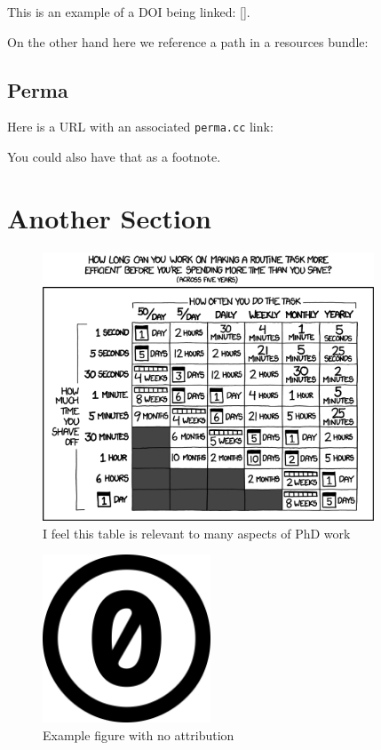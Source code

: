 This is an example of a DOI being linked: [].

On the other hand here we reference a path in a resources bundle:\\

\subsection{Perma}
\label{sec:example..links.doi}


Here is a URL with an associated \texttt{perma.cc} link:\\

You could also have that as a footnote.


\section{Another Section}
\label{sec:example.another}

\lipsum[3]

\begin{figure}[h!]
	\centering
	\captionsetup{justification=centering}
	\includegraphics[height=8cm]{images/examples/xkcd_1205_is_it_worth_the_time_2x.png}
	\caption[Example figure B]{I feel this table is relevant to many aspects of PhD work\protect\footnotemark}
	\label{fig:example.b}
\end{figure}

\lipsum[4]

\begin{figure}[h!]
	\centering
	\captionsetup{justification=centering}
	\includegraphics[height=5cm]{images/examples/cc-zero.png}
	\caption{Example figure with no attribution}
	\label{fig:example.c}
\end{figure}



